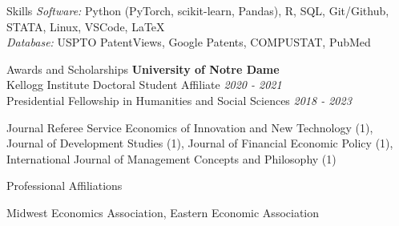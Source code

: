 \documentclass{resume} %
\begin{document}

\begin{rSection}{Skills}
\textit{Software:} Python (PyTorch, scikit-learn, Pandas), R, SQL, Git/Github, STATA, Linux, VSCode, \LaTeX \\
\textit{Database:} USPTO PatentViews, Google Patents, COMPUSTAT, PubMed
\end{rSection}
 
\begin{rSection}{Awards and Scholarships}
	{\bf University of Notre Dame}  \\ 
	Kellogg Institute Doctoral Student Affiliate \hfill {\em 2020 - 2021} \\
	Presidential Fellowship in Humanities and Social Sciences \hfill {\em 2018 - 2023}
\end{rSection}

\begin{rSection}{Journal Referee Service}
	Economics of Innovation and New Technology (1), Journal of Development Studies (1), Journal of Financial Economic Policy (1), International Journal of Management Concepts and Philosophy (1)
\end{rSection}

\begin{rSection}{Professional Affiliations}


	Midwest Economics Association, Eastern Economic Association
\end{rSection}




 	
 
\end{document}
